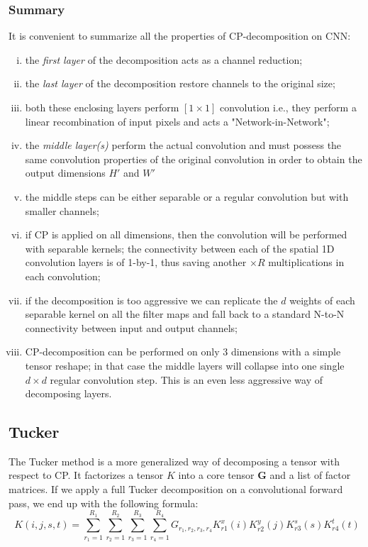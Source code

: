 \subsubsection{Summary}
\label{subsec:cp-summary}
It is convenient to summarize all the properties of CP-decomposition on CNN: 
\begin{enumerate}[(i)]
	\item the \emph{first layer} of the decomposition acts as a channel reduction;
	
	\item the \emph{last layer} of the decomposition restore channels to the original size; 
	
	\item both these enclosing layers perform $[1 \times 1]$ convolution i.e., they perform a linear recombination of input pixels and acts a "Network-in-Network";
	
	\item the \emph{middle layer(s)} perform the actual convolution and must possess the same convolution properties of the original convolution in order to obtain the output dimensions $H'$ and $W'$
	
	\item the middle steps can be either separable or a regular convolution but with smaller channels; 
	
	\item if CP is applied on all dimensions, then the convolution will be performed with separable kernels; the connectivity between each of the spatial 1D convolution layers is of 1-by-1, thus saving another $\times R$ multiplications in each convolution; 
	
	\item if the decomposition is too aggressive we can replicate the $d$ weights of each separable kernel on all the filter maps and fall back to a standard N-to-N connectivity between input and output channels; 
	
	\item CP-decomposition can be performed on only 3 dimensions with a simple tensor reshape; in that case the middle layers will collapse into one single $d \times d$ regular convolution step. This is an even less aggressive way of decomposing layers. 
 
\end{enumerate}

\subsection{Tucker}
The Tucker method is a more generalized way of decomposing a tensor with respect to CP. It factorizes a tensor $K$ into a core tensor $\mathbf{G}$ and a list of factor matrices. If we apply a full Tucker decomposition on a convolutional forward pass, we end up with the following formula: 
\begin{equation}
   K(i, j, s, t) = \sum_{r_1=1}^{R_1}\sum_{r_2=1}^{R_2}\sum_{r_3=1}^{R_3}\sum_{r_4=1}^{R_4}G_{r_1, r_2, r_3, r_4}  K^x_{r1}(i)K^y_{r2}(j)K^s_{r3}(s)K^t_{r4}(t) 
\end{equation}

